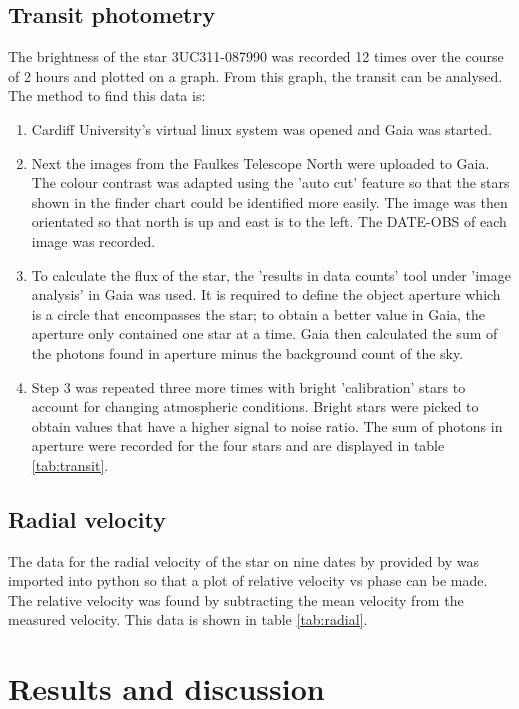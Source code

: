 \documentclass[10pt]{article}
\begin{document}
\subsection{Transit photometry}
The brightness of the star 3UC311-087990 was recorded 12 times over the course of 2 hours and plotted on a graph. From this graph, the transit can be analysed. The method to find this data is:
\begin{enumerate}
	\item Cardiff University's virtual linux system was opened and Gaia was started.
	\item Next the images from the Faulkes Telescope North were uploaded to Gaia. The colour contrast was adapted using the 'auto cut' feature so that the stars shown in the finder chart could be identified more easily. The image was then orientated so that north is up and east is to the left. The DATE-OBS of each image was recorded.
	\item To calculate the flux of the star, the 'results in data counts' tool under 'image analysis' in Gaia was used. It is required to define the object aperture which is a circle that encompasses the star; to obtain a better value in Gaia, the aperture only contained one star at a time. Gaia then calculated the sum of the photons found in aperture minus the background count of the sky.
	\item Step 3 was repeated three more times with bright 'calibration' stars to account for changing atmospheric conditions. Bright stars were picked to obtain values that have a higher signal to noise ratio. The sum of photons in aperture were recorded for the four stars and are displayed in table \ref{tab:transit}.
\end{enumerate}
\pagebreak
\subsection{Radial velocity}
The data for the radial velocity of the star on nine dates by \cite{Alsubai_2011} provided by \cite[p.77]{labhandbook} was imported into python so that a plot of relative velocity vs phase can be made. The relative velocity was found by subtracting the mean velocity from the measured velocity. This data is shown in table \ref{tab:radial}.

\section{Results and discussion}
\end{document}
